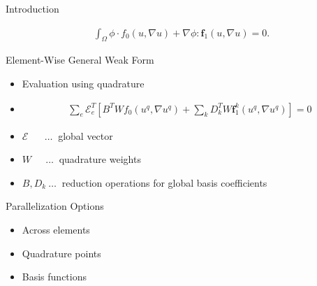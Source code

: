 \begin{frame}{Introduction}

\begin{center} \vspace*{-0.5cm}
   \begin{align*}
    \int_\Omega \phi\cdot f_0(u,\nabla u) + \nabla\phi:\mathbf{f}_1(u,\nabla u) = 0.
   \end{align*}
\end{center}


 \begin{block}{Element-Wise General Weak Form}
  \begin{itemize}
   \item Evaluation using quadrature
   \item \vspace*{-0.2cm} \begin{align*}
  \sum_e \mathcal{E}^T_e \left[ B^T W f_0(u^q, \nabla u^q) + \sum_k D^T_k W \mathbf{f}^k_1(u^q, \nabla u^q) \right] = 0
         \end{align*}
   \item $ \mathcal{E} \ \quad \ \ \ldots \ $ global vector
   \item $ W \quad \ \ \ldots \ $ quadrature weights
   \item $ B, D_k \ \ldots \ $ reduction operations for global basis coefficients
  \end{itemize}
 \end{block}
 
  \begin{block}{Parallelization Options}
  \begin{itemize}
   \item Across elements
   \item Quadrature points
   \item Basis functions
  \end{itemize}
 \end{block}

\end{frame}



